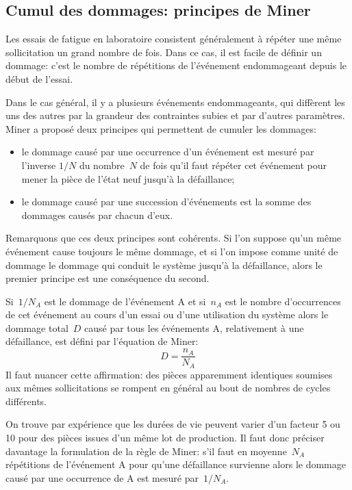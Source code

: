 \medskip
\subsection{Cumul des dommages: principes de Miner}

\medskip
Les essais de fatigue en laboratoire consistent généralement à répéter une même sollicitation un grand nombre de fois. Dans ce cas, il est facile de définir un dommage: c'est le nombre de répétitions de l'événement endommageant depuis le début de l'essai.

Dans le cas général, il y a plusieurs événements endommageants, qui diffèrent les uns des autres par la grandeur des contraintes subies et par d'autres paramètres. Miner a proposé deux principes qui permettent de cumuler les dommages:
\begin{itemize}
  \item le dommage causé par une occurrence d'un événement est mesuré par l'inverse $1/N$ du nombre~$N$ de fois qu'il faut répéter cet événement pour mener la pièce de l'état neuf jusqu'à la défaillance;
  \item le dommage causé par une succession d'événements est la somme des dommages causés par chacun d'eux.
\end{itemize}

\medskip
Remarquons que ces deux principes sont cohérents. Si l'on suppose qu'un même événement cause toujours le même dommage, et si l'on impose comme unité de dommage le dommage qui conduit le système jusqu'à la défaillance, alors le premier principe est une conséquence du second.

Si~$1 / N_A$ est le dommage de l'événement A et si~$n_A$ est le nombre d'occurrences de cet événement au cours d'un essai ou d'une utilisation du système alors le dommage total~$D$ causé par tous les événements A, relativement à une défaillance, est défini par l'équation de Miner:
\begin{equation} D = \frac{n_A}{N_A} \end{equation}
\medskipvm
{} Il faut nuancer cette affirmation: des pièces apparemment identiques soumises aux mêmes sollicitations se rompent en général au bout de nombres de cycles différents. 

On trouve par expérience que les durées de vie peuvent varier d'un facteur 5 ou 10 pour des pièces issues d'un même lot de production. Il faut donc préciser davantage la formulation de la règle de Miner: s'il faut en moyenne~$N_A$ répétitions de l'événement A pour qu'une défaillance survienne alors le dommage causé par une occurrence de A est mesuré par~$1 / N_A$.

